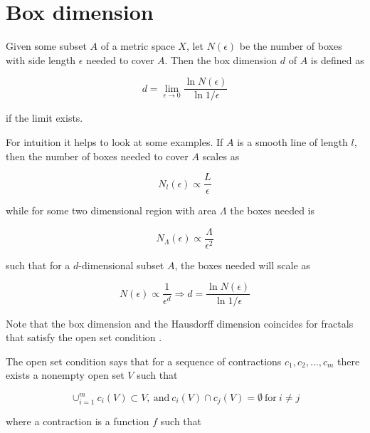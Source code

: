 \section{Box dimension}
\label{sec:boxdimension}

Given some subset $A$ of a metric space $X$, let $N(\epsilon)$ be the number of boxes with side length $\epsilon$ needed to cover $A$. Then the box dimension $d$ of $A$ is defined as \cite{strogatz:dynamics_chaos}

\begin{equation}
    d = \lim_{\epsilon \to 0} \frac{\ln N(\epsilon)}{\ln 1 / \epsilon}
\end{equation}

\noindent if the limit exists.

For intuition it helps to look at some examples. If $A$ is a smooth line of length $l$, then the number of boxes needed to cover $A$ scales as

\begin{equation}
    N_l(\epsilon) \propto \frac{L}{\epsilon}
\end{equation}

\noindent while for some two dimensional region with area $\Lambda$ the boxes needed is

\begin{equation}
    N_{\Lambda}(\epsilon) \propto \frac{\Lambda}{\epsilon^2}
\end{equation}

\noindent such that for a $d$-dimensional subset $A$, the boxes needed will scale as

\begin{equation}
    N (\epsilon) \propto \frac{1}{\epsilon^d} \Rightarrow d = \frac{\ln N(\epsilon)}{\ln 1 / \epsilon}
\end{equation}

Note that the box dimension and the Hausdorff dimension coincides for fractals that satisfy the open set condition \cite{Falconer:RelHausdorffBox}.

The open set condition says that for a sequence of contractions $c_1, c_2, ..., c_m$ there exists a nonempty open set $V$ such that \cite{Bandt:OSC}

\begin{equation}
    \cup_{i = 1}^m c_i(V) \subset V, \ \text{and} \ c_i(V) \cap c_j(V) = \emptyset \ \text{for} \ i \neq j
\end{equation}

\noindent where a contraction is a function $f$ such that

